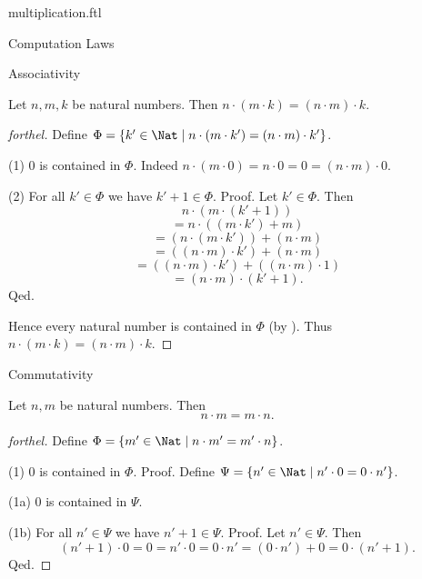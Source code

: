 \documentclass{naproche-library}
\begin{document}
\begin{smodule}[title=Multiplication]{multiplication.ftl}
\begin{sfragment}{Computation Laws}
  \begin{sfragment}{Associativity}
    \begin{proposition}[forthel,id=ARITHMETIC_06_347295585402880]
      Let $n, m, k$ be natural numbers.
      Then $n \cdot (m \cdot k) = (n \cdot m) \cdot k$.
    \end{proposition}
    \begin{proof}[forthel]
      Define $\Phi = \{ k' \in \Nat \mid n \cdot (m \cdot k') = (n \cdot m) \cdot k' \}$.

      (1) $0$ is contained in $\Phi$.
      Indeed $n \cdot (m \cdot 0)
        = n \cdot 0
        = 0
        = (n \cdot m) \cdot 0$.

      (2) For all $k' \in \Phi$ we have $k' + 1 \in \Phi$. \newline
      Proof.
        Let $k' \in \Phi$.
        Then
        \[  n \cdot (m \cdot (k' + 1))                          \]
        \[    = n \cdot ((m \cdot k') + m)                      \]
        \[    = (n \cdot (m \cdot k')) + (n \cdot m)            \]
        \[    = ((n \cdot m) \cdot k') + (n \cdot m)            \]
        \[    = ((n \cdot m) \cdot k') + ((n \cdot m) \cdot 1)  \]
        \[    = (n \cdot m) \cdot (k' + 1).                     \]
      Qed.

      Hence every natural number is contained in $\Phi$ (by ).
      Thus $n \cdot (m \cdot k) = (n \cdot m) \cdot k$.
    \end{proof}
  \end{sfragment}

  \begin{sfragment}{Commutativity}
    \begin{proposition}[forthel,id=ARITHMETIC_06_1764759896588288]
      Let $n, m$ be natural numbers.
      Then \[ n \cdot m = m \cdot n. \]
    \end{proposition}
    \begin{proof}[forthel]
      Define $\Phi = \{ m' \in \Nat \mid n \cdot m' = m' \cdot n \}$.

      (1) $0$ is contained in $\Phi$. \newline
      Proof.
        Define $\Psi = \{ n' \in \Nat \mid n' \cdot 0 = 0 \cdot n' \}$.

        (1a) $0$ is contained in $\Psi$.

        (1b) For all $n' \in \Psi$ we have $n' + 1 \in \Psi$. \newline
        Proof.
          Let $n' \in \Psi$.
          Then
          \[ (n' + 1) \cdot 0
            = 0
            = n' \cdot 0
            = 0 \cdot n'
            = (0 \cdot n') + 0
            = 0 \cdot (n' + 1). \]
        Qed.


\end{proof}
\end{sfragment}
\end{sfragment}
\end{smodule}
\end{document}
